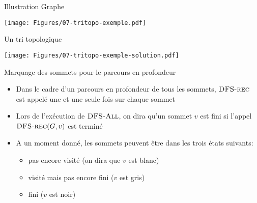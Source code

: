 \begin{frame}{Illustration}
Graphe

\centerline{\texttt{[image: Figures/07-tritopo-exemple.pdf]}}

\bigskip

Un tri topologique

\centerline{\texttt{[image: Figures/07-tritopo-exemple-solution.pdf]}}

\end{frame}

\begin{frame}{Marquage des sommets pour le parcours en profondeur}

\begin{itemize}
\item Dans le cadre d'un parcours en profondeur de tous les sommets,
  $\textnormal{\scshape DFS-rec}$ est appelé une et une seule fois sur chaque sommet
\item Lors de l'exécution de $\textnormal{\scshape DFS-All}$, on dira qu'un sommet
  $v$ est \alert{fini} si l'appel $\textnormal{\scshape DFS-rec}(G,v)$ est terminé
\item A un moment donné, les sommets peuvent être dans les trois états suivants:
\begin{itemize}
\item pas encore visité (on dira que $v$ est \alert{blanc})
\item visité mais pas encore fini ($v$ est \alert{gris})
\item fini ($v$ est \alert{noir})
\end{itemize}
\end{itemize}
\end{frame}

